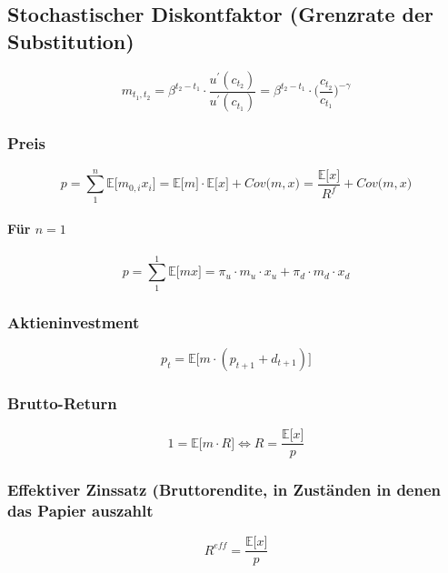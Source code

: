 \subsection{Stochastischer Diskontfaktor (Grenzrate der Substitution)}
\begin{equation}
	m_{t_1,t_2} = \beta^{t_2 - t_1} \cdot \frac{u^\prime(c_{t_2})}{u^\prime(c_{t_1})} = \beta^{t_2 - t_1} \cdot \bigg(\frac{c_{t_2}}{c_{t_1}}\bigg)^{-\gamma} \label{eq:m}
\end{equation}

\subsubsection{Preis}
\begin{equation}
	p = \sum^n_1 \mathbb{E} \big\lbrack m_{0,i} x_i \big\rbrack = \mathbb{E} \big\lbrack m \big\rbrack \cdot \mathbb{E} \big\lbrack x \big\rbrack + Cov\big(m,x\big) = \frac{\mathbb{E} \big\lbrack x \big\rbrack}{R^f} + Cov\big(m,x\big) \label{eq:p}
\end{equation}
\paragraph{Für \(n=1\)}
\begin{equation}
	p = \sum^1_1 \mathbb{E} \big\lbrack m x \big\rbrack = \pi_u \cdot m_u \cdot x_u + \pi_d \cdot m_d \cdot x_d
\end{equation}

\subsubsection{Aktieninvestment}
\begin{equation}
	p_t = \mathbb{E} \big\lbrack m \cdot (p_{t+1} + d_{t+1}) \big\rbrack \label{eq:paktie}
\end{equation}

\subsubsection{Brutto-Return}
\begin{equation}
	1 = \mathbb{E} \big\lbrack m \cdot R \big\rbrack \Leftrightarrow R = \frac{\mathbb{E} \big\lbrack x \big\rbrack}{p} \label{eq:br}
\end{equation}

\subsubsection{Effektiver Zinssatz (Bruttorendite, in Zuständen in denen das Papier auszahlt}
\begin{equation}
	R^{eff} = \frac{\mathbb{E} \big\lbrack x \big\rbrack}{p}
\end{equation}

